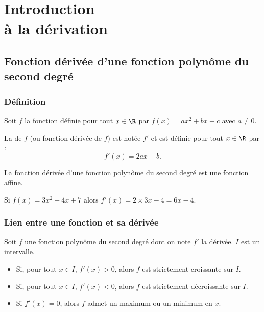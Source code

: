 \documentclass[10pt,openright,twoside,french]{book}
\begin{document}
\chapter[Dérivation]{Introduction \\ à la dérivation}\label{ch_derivation}

\section{Fonction dérivée d'une fonction polynôme du second degré}
\subsection{Définition}

\begin{Defi}
    Soit $f$ la fonction définie pour tout $x\in \R$ par $f(x) = ax^2 + bx + c$ avec $a \neq 0$.\par
    La  de $f$ (ou fonction dérivée de $f$) est notée $f'$ et est définie pour tout $x \in \R$ par :
    \[f'(x) = 2ax + b.\]
\end{Defi}

\begin{Rmq}
    La fonction dérivée d'une fonction polynôme du second degré est une fonction affine.
\end{Rmq}

\begin{Exemple}
    Si $f(x) = 3x^2 - 4x + 7$ alors $f'(x) = 2 \times 3 x -4 = 6x - 4$.
\end{Exemple}

\subsection{Lien entre une fonction et sa dérivée}

\begin{Thm}[(admis)]
    Soit $f$ une fonction polynôme du second degré dont on note $f'$ la dérivée. $I$ est un intervalle.
    \begin{itemize}
        \item Si, pour tout $x \in I$, $f' (x)> 0$, alors $f$ est strictement croissante sur $I$.
        \item Si, pour tout $x \in I$, $f' (x)< 0$, alors $f$ est strictement décroissante sur $I$.
        \item Si $f'(x) = 0$, alors $f$ admet un maximum ou un minimum en $x$.
    \end{itemize}
\end{Thm}
\end{document}
